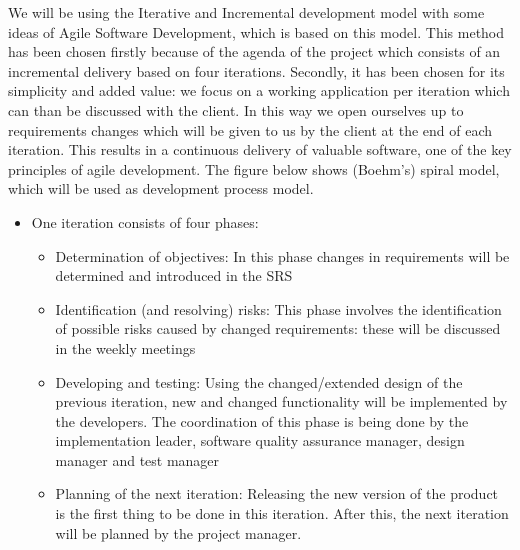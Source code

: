 \documentclass[12pt]{article}
\begin{document}
We will be using the Iterative and
Incremental development model with some ideas of
Agile Software Development, which is based on this
model. This method has been chosen firstly because of the agenda of the
project which consists of an incremental delivery based on four
iterations. Secondly, it has been chosen for its simplicity and added
value: we focus on a working application per iteration which can than be
discussed with the client. In this way we open ourselves up to
requirements changes which will be given to us by the client at the end
of each iteration. This results in a continuous delivery of valuable
software, one of the key principles of agile development. The figure
below shows (Boehm's) spiral model, which will
be used as development process model.

\begin{itemize}
\itemsep1pt\parskip0pt
\item
  One iteration consists of four phases:

  \begin{itemize}
  \itemsep1pt\parskip0pt
  \item
    Determination of objectives: In this phase changes in requirements
    will be determined and introduced in the SRS\\
  \item
    Identification (and resolving) risks: This phase involves the
    identification of possible risks caused by changed requirements:
    these will be discussed in the weekly meetings
  \item
    Developing and testing: Using the changed/extended design of the
    previous iteration, new and changed functionality will be
    implemented by the developers. The coordination of this phase is
    being done by the implementation leader, software quality assurance
    manager, design manager and test manager
  \item
    Planning of the next iteration: Releasing the new version of the
    product is the first thing to be done in this iteration. After this,
    the next iteration will be planned by the project manager.
  \end{itemize}
\end{itemize}
\end{document}
